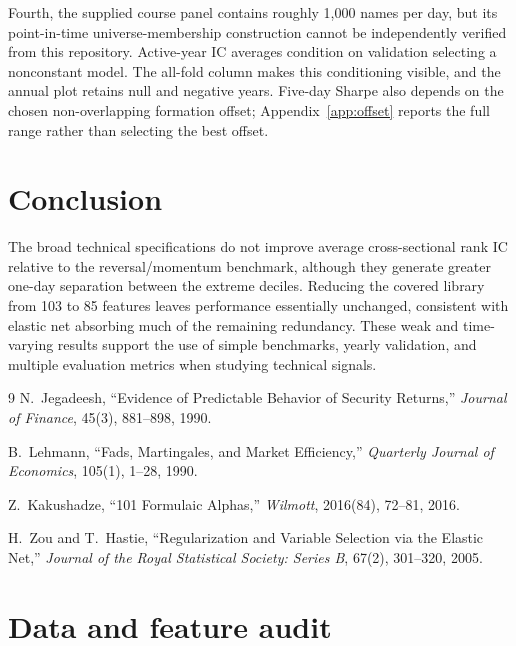 \documentclass[11pt]{article}
\begin{document}
Fourth, the supplied course panel contains roughly 1{,}000 names per day, but
its point-in-time universe-membership construction cannot be independently
verified from this repository. Active-year IC averages condition on validation selecting a
nonconstant model. The all-fold column makes this conditioning visible, and
the annual plot retains null and negative years. Five-day Sharpe also depends
on the chosen non-overlapping formation offset; Appendix~\ref{app:offset}
reports the full range rather than selecting the best offset.

\section{Conclusion}

The broad technical specifications do not improve average cross-sectional
rank IC relative to the reversal/momentum benchmark, although they generate
greater one-day separation between the extreme deciles. Reducing the covered
library from 103 to 85 features leaves performance essentially unchanged,
consistent with elastic net absorbing much of the remaining redundancy.
These weak and time-varying results support the use of simple benchmarks,
yearly validation, and multiple evaluation metrics when studying technical
signals.

\begin{thebibliography}{9}
N.~Jegadeesh, ``Evidence of Predictable Behavior of Security Returns,''
\textit{Journal of Finance}, 45(3), 881--898, 1990.

B.~Lehmann, ``Fads, Martingales, and Market Efficiency,''
\textit{Quarterly Journal of Economics}, 105(1), 1--28, 1990.

Z.~Kakushadze, ``101 Formulaic Alphas,'' \textit{Wilmott},
2016(84), 72--81, 2016.

H.~Zou and T.~Hastie, ``Regularization and Variable Selection via the
Elastic Net,'' \textit{Journal of the Royal Statistical Society: Series B},
67(2), 301--320, 2005.
\end{thebibliography}

\clearpage
\appendix

\section{Data and feature audit}
\end{document}

